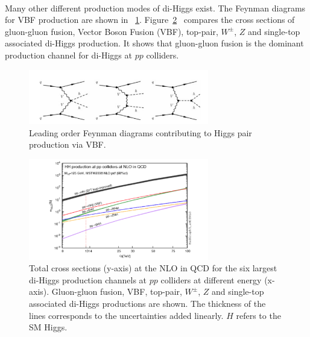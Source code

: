 \paragraph{}
Many other different production modes of di-Higgs exist. 
The Feynman diagrams for VBF production are shown in ~\ref{fig:SM_HH_VBF}. 
Figure~\ref{fig:SM_HH_xsec}~\cite{Frederix:2014hta} compares the cross sections of gluon-gluon fusion, Vector Boson Fusion (VBF), top-pair, $W^{\pm}$, $Z$ and single-top associated di-Higgs production.
It shows that gluon-gluon fusion is the dominant production channel for di-Higgs at $pp$ colliders. 

\begin{figure}[htbp!]
  \centering
  \captionsetup{justification=centering}
  \includegraphics[width=0.7\textwidth]{figures/theory/SM_HH_VBF}
  \caption{Leading order Feynman diagrams contributing to Higgs pair production via VBF.}
  \label{fig:SM_HH_VBF}
\end{figure}

\begin{figure}[htbp!]
  \centering
  \captionsetup{justification=centering}
  \includegraphics[width=0.7\textwidth]{figures/theory/HH_xsec}
  \caption{Total cross sections (y-axis) at the NLO in QCD for the six largest di-Higgs production channels at $pp$ colliders at different energy (x-axis). Gluon-gluon fusion, VBF, top-pair, $W^{\pm}$, $Z$ and single-top associated di-Higgs productions are shown. The thickness of the lines corresponds to the uncertainties added linearly. $H$ refers to the SM Higgs.}
  \label{fig:SM_HH_xsec}
\end{figure}

